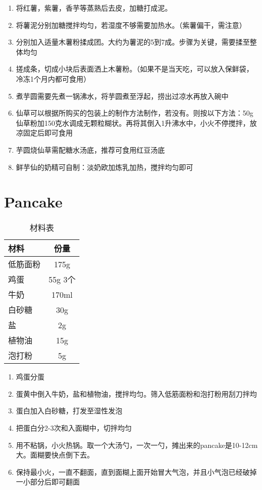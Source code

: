 \begin{enumerate}
    \item 将红薯，紫薯，香芋等蒸熟后去皮，加糖打成泥。
    \item 将薯泥分别加糖搅拌均匀，若湿度不够需要加热水。（紫薯偏干，需注意）
    \item 分别加入适量木薯粉揉成团。大约为薯泥的5到7成。步骤为关键，需要揉至整体均匀
    \item 搓成条，切成小块后表面洒上木薯粉。（如果不是当天吃，可以放入保鲜袋，冷冻1个月内都可食用）
    \item 煮芋圆需要先煮一锅沸水，将芋圆煮至浮起，捞出过凉水再放入碗中
    \item 仙草可以根据所购买的包装上的制作方法制作，若没有。则按以下方法：50g仙草粉加150克水调成无颗粒糊状。再将其倒入1升沸水中，小火不停搅拌，放凉固定后即可食用
    \item 芋圆烧仙草需配糖水汤底，推荐可食用红豆汤底
    \item 鲜芋仙的奶精可自制：淡奶欧加炼乳加热，搅拌均匀即可
\end{enumerate}

\section{Pancake}

\begin{table}[H]
    \centering
    \begin{tabular}{|l||c|}\hline
     \textbf{材料}    &  \textbf{份量}\\ \hline\hline
    低筋面粉 & 175g \\ \hline
    鸡蛋 & 55g 3个 \\ \hline
    牛奶 & 170ml \\ \hline
    白砂糖 & 30g\\ \hline
    盐 & 2g\\ \hline
    植物油 & 15g\\ \hline
    泡打粉 & 5g \\ \hline
    \end{tabular}
    \caption{材料表}
\end{table}

\begin{enumerate}
    \item 鸡蛋分蛋
    \item 蛋黄中倒入牛奶，盐和植物油，搅拌均匀。筛入低筋面粉和泡打粉用刮刀拌均
    \item 蛋白加入白砂糖，打发至湿性发泡
    \item 把蛋白分2-3次和入面糊中，切拌均匀
    \item 用不粘锅，小火热锅。取一个大汤勺，一次一勺，摊出来的pancake是10-12cm大。面糊要快点倒下去。
    \item 保持最小火，一直不翻面，直到面糊上面开始冒大气泡，并且小气泡已经破掉一小部分后即可翻面
\end{enumerate}


